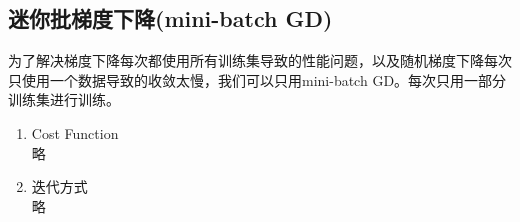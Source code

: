 \subsection{迷你批梯度下降(mini-batch GD)}
为了解决梯度下降每次都使用所有训练集导致的性能问题，以及随机梯度下降每次只使用一个数据导致的收敛太慢，我们可以只用mini-batch GD。每次只用一部分训练集进行训练。
\begin{enumerate}
	\item Cost Function \\
	略

	\item 迭代方式 \\
	略
\end{enumerate}










